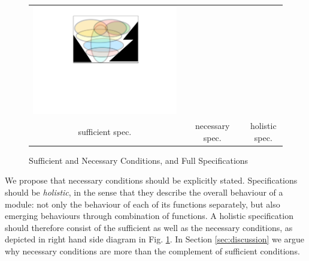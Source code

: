 \begin{figure}[htb]
\begin{tabular}{ccccc}
\begin{minipage}{0.25\textwidth}
 \includegraphics[width=\linewidth, trim=250  320 260 60,clip]{diagrams/NecAndSuff.pdf}
\end{minipage}
\\
sufficient  spec.& & necessary spec. & & holistic spec.
 \end{tabular}
  \vspace*{-2.5mm}
  \caption{Sufficient and Necessary Conditions, and Full Specifications}
 \label{fig:NecessaryAndSuff}
 \end{figure}
 
 We propose that  necessary conditions should be explicitly stated. Specifications should be \emph{holistic}, in the sense that they describe the  overall behaviour of a module: not only the behaviour of each of its functions separately, but also 
 emerging behaviours through combination of functions.
A holistic specification should therefore consist of   the sufficient as well as the necessary conditions, as  
depicted in right hand side  diagram in Fig. \ref{fig:NecessaryAndSuff}.
In Section \ref{sec:discussion} we argue why necessary conditions are more than the complement of
sufficient conditions.

